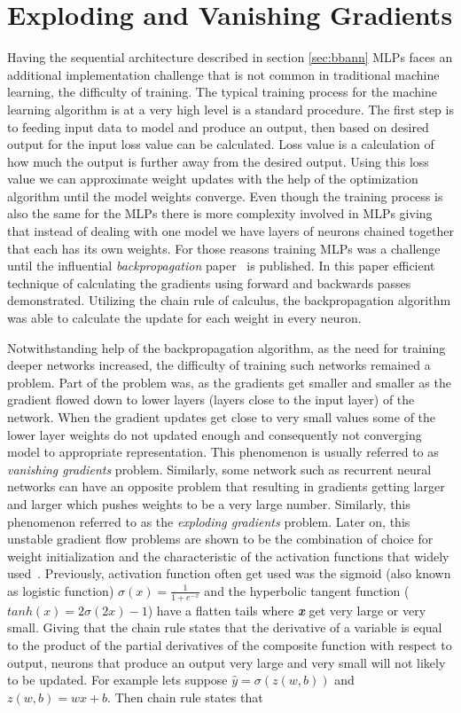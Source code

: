 \section{Exploding and Vanishing Gradients} \label{sec:gradients}
Having the sequential architecture described in section \ref{sec:bbann} MLPs faces an additional implementation challenge that is not common in traditional machine learning, the difficulty of training. 
The typical training process for the machine learning algorithm is at a very high level is a standard procedure.  
The first step is to feeding input data to model and produce an output, then based on desired output for the input loss value can be calculated.
Loss value is a calculation of how much the output is further away from the desired output. 
Using this loss value we can approximate weight updates with the help of the optimization algorithm until the model weights converge.
Even though the training process is also the same for the MLPs there is more complexity involved in MLPs giving that instead of dealing with one model we have layers of neurons chained together that each has its own weights. 
For those reasons training MLPs was a challenge until the influential \emph{backpropagation} paper~\cite{backprop} is published. In this paper efficient technique of calculating the gradients using forward and backwards passes demonstrated.
Utilizing the chain rule of calculus, the backpropagation algorithm was able to calculate the update for each weight in every neuron.

Notwithstanding help of the backpropagation algorithm, as the need for training deeper networks increased, the difficulty of training such networks remained a problem.
Part of the problem was, as the gradients get smaller and smaller as the gradient flowed down to lower layers (layers close to the input layer) of the network. 
When the gradient updates get close to very small values some of the lower layer weights do not updated enough and consequently not converging model to appropriate representation.
This phenomenon is usually referred to as \emph{vanishing gradients} problem.
Similarly, some network such as recurrent neural networks can have an opposite problem that resulting in gradients getting larger and larger which pushes weights to be a very large number. 
Similarly, this phenomenon referred to as the \emph{exploding gradients} problem.
Later on, this unstable gradient flow problems are shown to be the combination of choice for weight initialization and the characteristic of the activation functions that widely used~\cite{vanishgrads}.
Previously, activation function often get used was the sigmoid (also known as logistic function) \(\sigma(x) = \frac{1}{1 + e^{-x}}\) and the hyperbolic tangent function (\(tanh(x) = 2\sigma(2x) -1\)) have a flatten tails where \textbf{\textit{x}} get very large or very small. 
Giving that the chain rule states that the derivative of a variable is equal to the product of the partial derivatives of the composite function with respect to output, neurons that produce an output very large and very small will not likely to be updated. 
For example lets suppose \(\hat{y} = \sigma(z(w, b))\) and \(z(w, b) = wx + b\). Then chain rule states that

